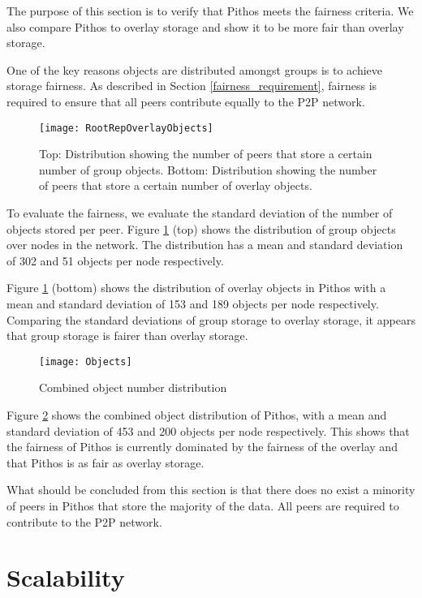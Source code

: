 The purpose of this section is to verify that Pithos meets the fairness criteria. We also compare Pithos to overlay storage and show it to be more fair than overlay storage.

One of the key reasons objects are distributed amongst groups is to achieve storage fairness. As described in Section \ref{fairness_requirement}, fairness is required to ensure that all peers contribute equally to the P2P network.

\begin{figure}[htbp]
 \centering
 \texttt{[image: RootRepOverlayObjects]}
 \caption{Top: Distribution showing the number of peers that store a certain number of group objects. Bottom: Distribution showing the number of peers that store a certain number of overlay objects.}
 \label{fig_group_overlay_objects}
\end{figure}
%
To evaluate the fairness, we evaluate the standard deviation of the number of objects stored per peer. Figure \ref{fig_group_overlay_objects} (top) shows the distribution of group objects over nodes in the network. The distribution has a mean and standard deviation of 302 and 51 objects per node respectively.

Figure \ref{fig_group_overlay_objects} (bottom) shows the distribution of overlay objects in Pithos with a mean and standard deviation of 153 and 189 objects per node respectively. Comparing the standard deviations of group storage to overlay storage, it appears that group storage is fairer than overlay storage.

\begin{figure}[htbp]
 \centering
 \texttt{[image: Objects]}
 \caption{Combined object number distribution}
 \label{fig_objects}
\end{figure}
%
Figure \ref{fig_objects} shows the combined object distribution of Pithos, with a mean and standard deviation of 453 and 200 objects per node respectively. This shows that the fairness of Pithos is currently dominated by the fairness of the overlay and that Pithos is as fair as overlay storage.

What should be concluded from this section is that there does no exist a minority of peers in Pithos that store the majority of the data. All peers are required to contribute to the P2P network.

\section{Scalability}


